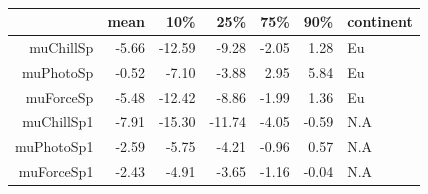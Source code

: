 \documentclass[12pt]{article}\usepackage[]{graphicx}\usepackage[]{color}
\begin{document}
\begin{table}[ht]
\centering
\begin{tabular}{rrrrrrl}
  \hline
 & mean & 10\% & 25\% & 75\% & 90\% & continent \\ 
  \hline
muChillSp & -5.66 & -12.59 & -9.28 & -2.05 & 1.28 & Eu \\ 
  muPhotoSp & -0.52 & -7.10 & -3.88 & 2.95 & 5.84 & Eu \\ 
  muForceSp & -5.48 & -12.42 & -8.86 & -1.99 & 1.36 & Eu \\ 
  muChillSp1 & -7.91 & -15.30 & -11.74 & -4.05 & -0.59 & N.A \\ 
  muPhotoSp1 & -2.59 & -5.75 & -4.21 & -0.96 & 0.57 & N.A \\ 
  muForceSp1 & -2.43 & -4.91 & -3.65 & -1.16 & -0.04 & N.A \\ 
   \hline
\end{tabular}
\caption{}
\end{table}
\fi 
\end{document}
